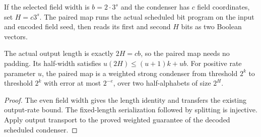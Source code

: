 \begin{definition}
  \label{def:lowerbounds-algebraic-explicit-pair-condenser}
  \leanok
  If the selected field width is $b=2\cdot3^s$ and the condenser has
  $c$ field coordinates, set $H=c3^s$. The paired map runs the actual
  scheduled bit program on the input and encoded field seed, then reads
  its first and second $H$ bits as two Boolean vectors.
\end{definition}

\begin{theorem}
  \label{thm:lowerbounds-algebraic-explicit-pair-condenser}
  \leanok
  The actual output length is exactly $2H=cb$, so the paired map needs
  no padding. Its half-width satisfies
  $u(2H)\le(u+1)k+ub$. For positive rate parameter $u$, the paired map is
  a weighted strong condenser from threshold $2^k$ to threshold $2^k$
  with error at most $2^{-e}$, over two half-alphabets of size $2^H$.
\end{theorem}
\begin{proof}
  \leanok
  The even field width gives the length identity and transfers the
  existing output-rate bound. The fixed-length serialization followed
  by splitting is injective. Apply output transport to the proved
  weighted guarantee of the decoded scheduled condenser.
\end{proof}

